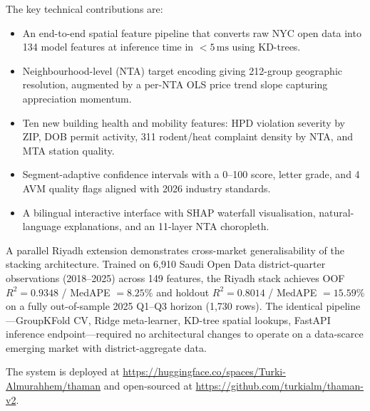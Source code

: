 \documentclass[11pt, a4paper, twoside]{article}
\begin{document}
The key technical contributions are:
\begin{itemize}[(a)]
  \item An end-to-end spatial feature pipeline that converts raw NYC open data
        into 134 model features at inference time in $< 5\,\text{ms}$ using KD-trees.
  \item Neighbourhood-level (NTA) target encoding giving 212-group geographic
        resolution, augmented by a per-NTA OLS price trend slope capturing
        appreciation momentum.
  \item Ten new building health and mobility features: HPD violation severity
        by ZIP, DOB permit activity, 311 rodent/heat complaint density by NTA,
        and MTA station quality.
  \item Segment-adaptive confidence intervals with a 0--100 score, letter grade,
        and 4 AVM quality flags aligned with 2026 industry standards.
  \item A bilingual interactive interface with SHAP waterfall visualisation,
        natural-language explanations, and an 11-layer NTA choropleth.
\end{itemize}

A parallel Riyadh extension demonstrates cross-market generalisability of the
stacking architecture. Trained on 6,910 Saudi Open Data district-quarter
observations (2018--2025) across 149 features, the Riyadh stack achieves OOF
$R^2 = 0.9348$ / MedAPE $= 8.25\%$ and holdout $R^2 = 0.8014$ / MedAPE
$= 15.59\%$ on a fully out-of-sample 2025 Q1--Q3 horizon (1,730 rows). The identical
pipeline---GroupKFold CV, Ridge meta-learner, KD-tree spatial lookups, FastAPI
inference endpoint---required no architectural changes to operate on a
data-scarce emerging market with district-aggregate data.

The system is deployed at \url{https://huggingface.co/spaces/Turki-Almurahhem/thaman}
and open-sourced at \url{https://github.com/turkialm/thaman-v2}.
\end{document}
